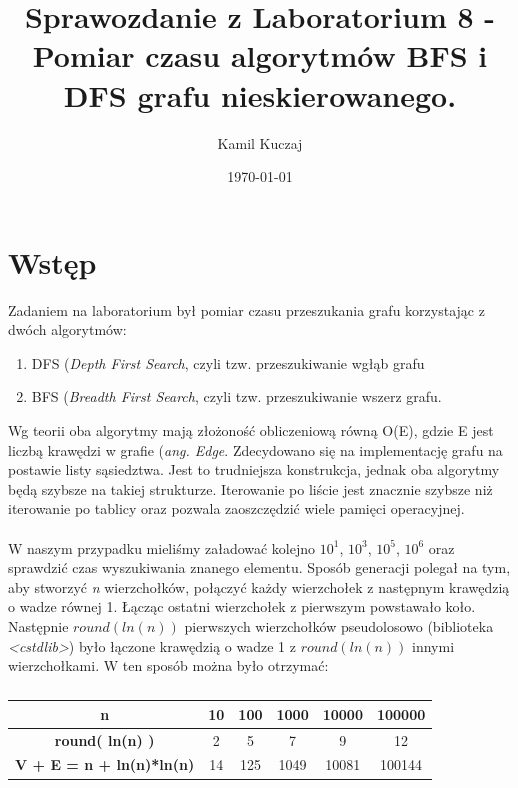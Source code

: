 \documentclass[11pt,a4paper]{article}
\author{Kamil Kuczaj}
\title{Sprawozdanie z Laboratorium 8 - Pomiar czasu algorytmów BFS i DFS grafu nieskierowanego.}
\date{\today}
\begin{document}
\maketitle

\section{Wstęp}
\hspace{4ex}Zadaniem na laboratorium był pomiar czasu przeszukania grafu korzystając z dwóch algorytmów:
\begin{enumerate}
\item DFS (\textit{Depth First Search}, czyli tzw. przeszukiwanie wgłąb grafu
\item BFS (\textit{Breadth First Search}, czyli tzw. przeszukiwanie wszerz grafu.
\end{enumerate} Wg teorii oba algorytmy mają złożoność obliczeniową równą O(E), gdzie E jest liczbą krawędzi w grafie (\textit{ang. Edge}. Zdecydowano się na implementację grafu na postawie listy sąsiedztwa. Jest to trudniejsza konstrukcja, jednak oba algorytmy będą szybsze na takiej strukturze. Iterowanie po liście jest znacznie szybsze niż iterowanie po tablicy oraz pozwala zaoszczędzić wiele pamięci operacyjnej.\\\\W naszym przypadku mieliśmy załadować kolejno $10^1$, $10^3$, $10^5$, $10^6$ oraz sprawdzić czas wyszukiwania znanego elementu. Sposób generacji polegał na tym, aby stworzyć \textit{n} wierzchołków, połączyć każdy wierzchołek z następnym krawędzią o wadze równej 1. Łącząc ostatni wierzchołek z pierwszym powstawało koło. Następnie $round(ln(n))$ pierwszych wierzchołków pseudolosowo (biblioteka \textit{<cstdlib>}) było łączone krawędzią o wadze 1 z $round(ln(n))$ innymi wierzchołkami. W ten sposób można było otrzymać:

\begin{table}[htbp]
\caption{}
\begin{center}
\begin{tabular}{|c|c|c|c|c|c|}
\hline
\textbf{n} & \textbf{10} & \textbf{100} & \textbf{1000} & \textbf{10000} & \textbf{100000} \\ \hline
\textbf{round( ln(n) )} & 2 & 5 & 7 & 9 & 12 \\ \hline
\textbf{V + E = n + ln(n)*ln(n)} & 14 & 125 & 1049 & 10081 & 100144 \\ \hline
\end{tabular}
\end{center}
\label{zlozonosc}
\end{table}
\end{document}
